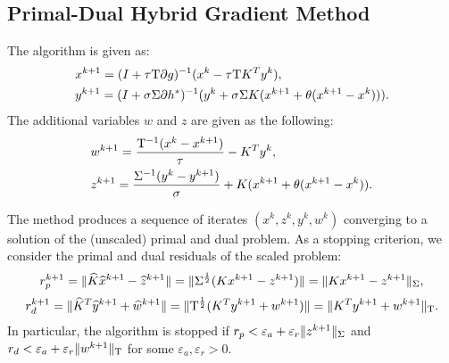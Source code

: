 \documentclass[english,11pt,a4paper]{article}
\begin{document}
\subsection{Primal-Dual Hybrid Gradient Method}
The algorithm is given as:
\begin{equation}
  \begin{aligned}
    &x^{k+1} = (I + \tau \mathrm{T} \partial g)^{-1}(x^k - \tau \mathrm{T} K^T y^k),\\
    &y^{k+1} = (I + \sigma \Sigma \partial h^*)^{-1}(y^k + \sigma \Sigma K (x^{k+1} + \theta (x^{k+1} - x^k))).\\
  \end{aligned}
  \label{eq:pdhgm}
\end{equation}
The additional variables $w$ and $z$ are given as the following:
\begin{equation}
  \begin{aligned}
    &w^{k+1} = \frac{\mathrm{T}^{-1}(x^k - x^{k+1})}{\tau} - K^T y^k,\\
    &z^{k+1} = \frac{\Sigma^{-1}(y^k - y^{k+1})}{\sigma} + K (x^{k+1} + \theta (x^{k+1} - x^k)).
  \end{aligned}
  \label{eq:pdhgm_zw}
\end{equation}

The method produces a sequence of iterates
$(x^k, z^k, y^k, w^k)$ converging to a solution of the (unscaled) primal and dual problem. As a stopping criterion, we consider the 
primal and dual residuals of the scaled problem:
\begin{equation}
  r_p^{k+1} = \Vert \widehat K \widehat x^{k+1} - \widehat z^{k+1} \Vert = \Vert \Sigma^{\frac{1}{2}} (K x^{k+1} - z^{k+1}) \Vert = \Vert Kx^{k+1} - z^{k+1} \Vert_{\Sigma},
\end{equation}
\begin{equation}
  r_d^{k+1} = \Vert \widehat K^T \widehat y^{k+1} + \widehat w^{k+1} \Vert = \Vert \mathrm{T}^{\frac{1}{2}} (K^T y^{k+1} + w^{k+1}) \Vert = \Vert K^T y^{k+1} + w^{k+1} \Vert_{\mathrm{T}}.
\end{equation}
In particular, the algorithm is stopped if $r_p < \varepsilon_a + \varepsilon_r \Vert z^{k+1} \Vert_{\Sigma}$ and $r_d < \varepsilon_a + \varepsilon_r \Vert w^{k+1} \Vert_{\mathrm{T}}$ for some $\varepsilon_a, \varepsilon_r > 0$.
\end{document}
